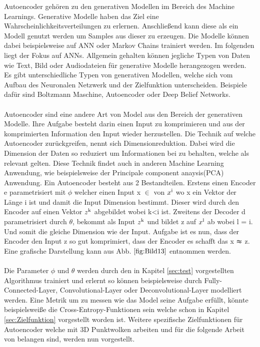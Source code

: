 \documentclass{llncs}
\begin{document}
Autoencoder gehören zu den generativen Modellen im Bereich des Machine Learnings. Generative Modelle haben das Ziel eine Wahrscheinlichkeitsverteilungen zu erlernen. Anschließend kann diese als ein Modell genutzt werden um Samples aus dieser zu erzeugen. Die Modelle können dabei beispielsweise auf ANN oder Markov Chains trainiert werden\cite{Grundlagen}. Im folgenden liegt der Fokus auf ANNs. Allgemein gehalten können jegliche Typen von Daten wie Text, Bild oder Audiodateien für generative Modelle herangezogen werden. Es gibt unterschiedliche Typen von generativen Modellen, welche sich vom Aufbau des Neuronalen Netzwerk und der Zielfunktion unterscheiden. Beispiele dafür sind Boltzmann Maschine, Autoencoder oder Deep Belief Networks\cite{Grundlagen}. 
\\\\
Autoencoder sind eine andere Art von Model aus den Bereich der generativen Modelle. Ihre Aufgabe besteht darin einen Input zu komprimieren und aus der komprimierten Information den Input wieder herzustellen. Die Technik auf welche Autoencoder zurückgreifen, nennt sich Dimensionreduktion. Dabei wird die Dimension der Daten so reduziert um Informationen bei zu behalten, welche als relevant gelten. Diese Technik findet auch in anderen Machine Learning Anwendung, wie beispielsweise der Principale component anaysis(PCA) Anwendung\cite{dimreduction}.  Ein Autoencoder besteht aus 2 Bestandteilen. Erstens einen Encoder e parametrisiert mit $\phi$ welcher einen Input x $\in$ von $x\textsuperscript{i}$ wo x ein Vektor der Länge i ist und damit die Input Dimension bestimmt. Dieser wird durch den Encoder auf einen Vektor $z\textsuperscript{k}$ abgebildet wobei k<i ist. Zweitens der Decoder d parametrisiert durch  $\theta$, bekommt als Input $z\textsuperscript{k}$ und bildet z auf $x\textsuperscript{l}$ ab wobei l = i. Und somit die gleiche Dimension wie der Input. Aufgabe ist es nun, dass der Encoder den Input z so gut komprimiert, dass der Encoder es schafft das x $\thickapprox$ z. Eine grafische Darstellung kann aus Abb. $\ref{fig:Bild13}$ entnommen werden\cite{Grundlagen}. 
\\\\
Die Parameter $\phi$ und $\theta$ werden durch den in Kapitel \ref{sec:test} vorgestellten Algorithmus trainiert und erlernt so können beispielsweise durch Fully-Connected-Layer, Convolutional-Layer oder Deconvolutional-Layer modelliert werden. Eine Metrik um zu messen wie das Model seine Aufgabe erfüllt, könnte beispielsweiße die Cross-Entropy-Funktionen sein welche schon in Kapitel \ref{sec:Zielfunktion} vorgestellt worden ist. Weitere spezifische Zielfunktionen für Autoencoder welche mit 3D Punktwolken arbeiten und für die folgende Arbeit von belangen sind, werden nun vorgestellt.
\end{document}
